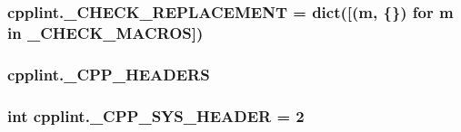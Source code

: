 \subsubsection[{\texorpdfstring{\+\_\+\+C\+H\+E\+C\+K\+\_\+\+R\+E\+P\+L\+A\+C\+E\+M\+E\+NT}{_CHECK_REPLACEMENT}}]{\setlength{\rightskip}{0pt plus 5cm}cpplint.\+\_\+\+C\+H\+E\+C\+K\+\_\+\+R\+E\+P\+L\+A\+C\+E\+M\+E\+NT = dict(\mbox{[}(m, \{\}) for m in {\bf \+\_\+\+C\+H\+E\+C\+K\+\_\+\+M\+A\+C\+R\+OS}\mbox{]})\hspace{0.3cm}{\ttfamily [private]}}\hypertarget{namespacecpplint_aa29e61cc2dc32e1e9f61ecaed2907b48}{}\label{namespacecpplint_aa29e61cc2dc32e1e9f61ecaed2907b48}
\subsubsection[{\texorpdfstring{\+\_\+\+C\+P\+P\+\_\+\+H\+E\+A\+D\+E\+RS}{_CPP_HEADERS}}]{\setlength{\rightskip}{0pt plus 5cm}cpplint.\+\_\+\+C\+P\+P\+\_\+\+H\+E\+A\+D\+E\+RS\hspace{0.3cm}{\ttfamily [private]}}\hypertarget{namespacecpplint_a4854144fb2320157db25efaf2fddcdff}{}\label{namespacecpplint_a4854144fb2320157db25efaf2fddcdff}
\subsubsection[{\texorpdfstring{\+\_\+\+C\+P\+P\+\_\+\+S\+Y\+S\+\_\+\+H\+E\+A\+D\+ER}{_CPP_SYS_HEADER}}]{\setlength{\rightskip}{0pt plus 5cm}int cpplint.\+\_\+\+C\+P\+P\+\_\+\+S\+Y\+S\+\_\+\+H\+E\+A\+D\+ER = 2\hspace{0.3cm}{\ttfamily [private]}}\hypertarget{namespacecpplint_aa9513a195daca7c7835216243625060d}{}\label{namespacecpplint_aa9513a195daca7c7835216243625060d}
